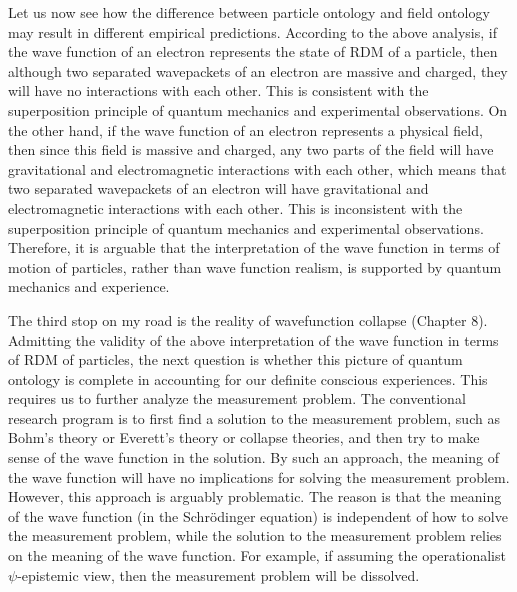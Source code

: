 Let us now see how the difference between particle ontology and field ontology may result in different empirical predictions.
According to the above analysis, if the wave function of an electron represents the state of RDM of a particle, then although two separated wavepackets of an electron are massive and charged, they will have no interactions with each other. This is consistent with the superposition principle of quantum mechanics and experimental observations.
On the other hand, if the wave function of an electron represents a physical field, then since this field is massive and charged, any two parts of the field will have gravitational and electromagnetic interactions with each other, which means that two separated wavepackets of an electron will have gravitational and electromagnetic interactions with each other. This is inconsistent with the superposition principle of quantum mechanics and experimental observations.
Therefore, it is arguable that the interpretation of the wave function in terms of motion of particles, rather than wave function realism, is supported by quantum mechanics and experience.


The third stop on my road is the reality of wavefunction collapse (Chapter 8).
Admitting the validity of the above interpretation of the wave function in terms of RDM of particles, the next question is whether this picture of quantum ontology is complete in accounting for our definite conscious experiences. 
This requires us to further analyze the measurement problem.
The conventional research program is to first find a solution to the measurement problem, such as Bohm's theory or Everett's theory or collapse theories, and then try to make sense of the wave function in the solution.
By such an approach, the meaning of the wave function will have no implications for solving the measurement problem.
However, this approach is arguably problematic.
The reason is that the meaning of the wave function (in the Schr\"{o}dinger equation) is independent of how to solve the measurement problem, while the solution to the measurement problem relies on the meaning of the wave function. For example, if assuming the operationalist $\psi$-epistemic view, then the measurement problem will be dissolved.


